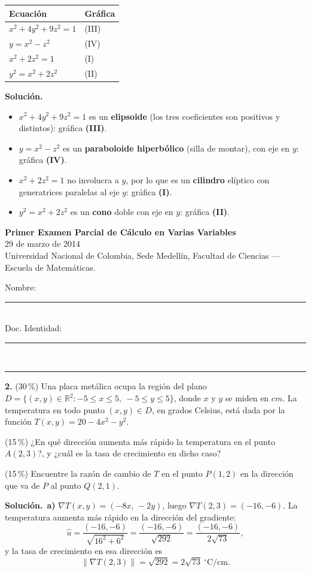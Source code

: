 \documentclass[11pt]{article}
\newcommand{\sol}{\medskip\noindent\textbf{\textcolor{solgreen}{Soluci\'on.}}\ }
\newcommand{\examheader}{%
  \noindent
  \begin{minipage}[t]{0.62\linewidth}
    {\bfseries\large Primer Examen Parcial de C\'alculo en Varias Variables}\\
    {\small 29 de marzo de 2014}\\
    {\small Universidad Nacional de Colombia, Sede Medell\'in, Facultad de Ciencias --- Escuela de Matem\'aticas.}
  \end{minipage}%
  \hfill
  \begin{minipage}[t]{0.33\linewidth}
    \raggedleft\small
    Nombre: \rule{2.8cm}{0.4pt}\\[4pt]
    Doc. Identidad: \rule{2.5cm}{0.4pt}
  \end{minipage}\\[4pt]
  \rule{\linewidth}{0.6pt}
}
\begin{document}
\begin{center}
\begin{tabular}{|l|l|}
\hline
\textbf{Ecuaci\'on} & \textbf{Gr\'afica}\\
\hline
$x^2+4y^2+9z^2=1$ & (III) \\
\hline
$y=x^2-z^2$ & (IV) \\
\hline
$x^2+2z^2=1$ & (I) \\
\hline
$y^2=x^2+2z^2$ & (II) \\
\hline
\end{tabular}
\end{center}

\sol
\begin{itemize}[itemsep=1pt,topsep=2pt]
  \item $x^2+4y^2+9z^2=1$ es un \textbf{elipsoide} (los tres coeficientes son positivos y distintos): gr\'afica \textbf{(III)}.
  \item $y=x^2-z^2$ es un \textbf{paraboloide hiperb\'olico} (silla de montar), con eje en $y$: gr\'afica \textbf{(IV)}.
  \item $x^2+2z^2=1$ no involucra a $y$, por lo que es un \textbf{cilindro} el\'iptico con generatrices paralelas al eje $y$: gr\'afica \textbf{(I)}.
  \item $y^2=x^2+2z^2$ es un \textbf{cono} doble con eje en $y$: gr\'afica \textbf{(II)}.
\end{itemize}

\newpage
\examheader
\vspace{2pt}

\noindent\textbf{2.} (30\,\%) Una placa met\'alica ocupa la regi\'on del plano $D=\{(x,y)\in\mathbb{R}^2 : -5\leq x\leq 5,\ -5\leq y\leq 5\}$, donde $x$ y $y$ se miden en $cm$. La temperatura en todo punto $(x,y)\in D$, en grados Celsius, est\'a dada por la funci\'on $T(x,y)=20-4x^2-y^2$.

\begin{opciones}
  \item[a)] (15\,\%) ¿En qu\'e direcci\'on aumenta m\'as r\'apido la temperatura en el punto $A(2,3)$?, y ¿cu\'al es la tasa de crecimiento en dicho caso?
  \item[b)] (15\,\%) Encuentre la raz\'on de cambio de $T$ en el punto $P(1,2)$ en la direcci\'on que va de $P$ al punto $Q(2,1)$.
\end{opciones}

\sol \textbf{a)} $\nabla T(x,y) = (-8x,\,-2y)$, luego $\nabla T(2,3) = (-16,-6)$. La temperatura aumenta m\'as r\'apido en la direcci\'on del gradiente:
$$\hat u = \frac{(-16,-6)}{\sqrt{16^2+6^2}} = \frac{(-16,-6)}{\sqrt{292}} = \frac{(-16,-6)}{2\sqrt{73}},$$
y la tasa de crecimiento en esa direcci\'on es
$$\|\nabla T(2,3)\| = \sqrt{292} = 2\sqrt{73}\ {}^{\circ}\text{C/cm}.$$
\end{document}

